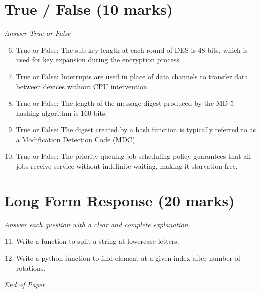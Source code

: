 \documentclass[12pt]{article}
\begin{document}
\section*{True / False (10 marks)}
\textit{Answer True or False}
\begin{enumerate}[label=\arabic*.]
\setcounter{enumi}{5}
\item True or False: The sub key length at each round of DES is 48 bits, which is used for key expansion during the encryption process.
\item True or False: Interrupts are used in place of data channels to transfer data between devices without CPU intervention.
\item True or False: The length of the message digest produced by the MD 5 hashing algorithm is 160 bits.
\item True or False: The digest created by a hash function is typically referred to as a Modification Detection Code (MDC).
\item True or False: The priority queuing job-scheduling policy guarantees that all jobs receive service without indefinite waiting, making it starvation-free.
\end{enumerate}

\section*{Long Form Response (20 marks)}
\textit{Answer each question with a clear and complete explanation.}
\begin{enumerate}[label=\arabic*.]
\setcounter{enumi}{10}
\item Write a function to split a string at lowercase letters.
\item Write a python function to find element at a given index after number of rotations.
\end{enumerate}

\vfill
\noindent\textit{End of Paper}
\end{document}
